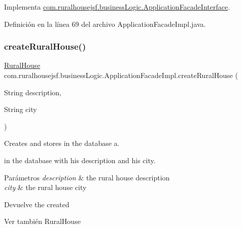 Implementa \mbox{\hyperlink{a00136_afaa6b314fb684fe1121f062481f2bcd9}{com.\+ruralhousejsf.\+business\+Logic.\+Application\+Facade\+Interface}}.



Definición en la línea 69 del archivo Application\+Facade\+Impl.\+java.

\mbox{\label{a00132_a48b82f812a30271878f50b99ae16a24b}} 
\subsubsection{\texorpdfstring{createRuralHouse()}{createRuralHouse()}}
{\footnotesize\ttfamily \mbox{\hyperlink{a00188}{Rural\+House}} com.\+ruralhousejsf.\+business\+Logic.\+Application\+Facade\+Impl.\+create\+Rural\+House (\begin{DoxyParamCaption}\item[{String}]{description,  }\item[{String}]{city }\end{DoxyParamCaption})}



Creates and stores in the database a. 


\begin{DoxyCode}{0}
\end{DoxyCode}
 in the database with his description and his city.


\begin{DoxyParams}{Parámetros}
{\em description} & the rural house description \\
\hline
{\em city} & the rural house city\\
\hline
\end{DoxyParams}
\begin{DoxyReturn}{Devuelve}
the created
\begin{DoxyCode}{0}
\end{DoxyCode}

\end{DoxyReturn}
\begin{DoxySeeAlso}{Ver también}
Rural\+House 
\end{DoxySeeAlso}


